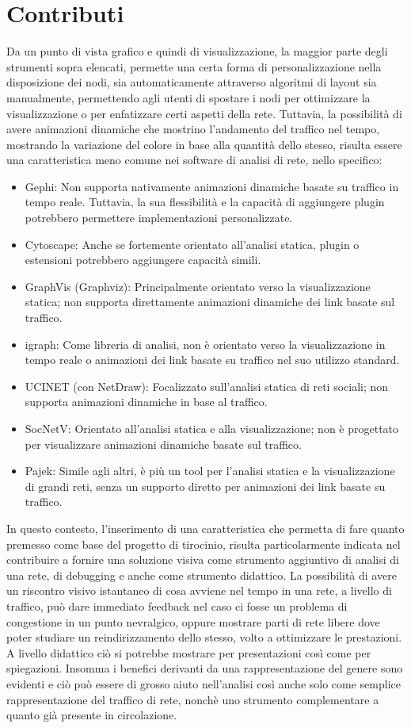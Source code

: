 \documentclass[binding=0.6cm]{sapthesis}
\begin{document}
\section{Contributi}
Da un punto di vista grafico e quindi di visualizzazione, la maggior parte degli strumenti sopra elencati, permette una certa forma di personalizzazione nella disposizione dei nodi, sia automaticamente attraverso algoritmi di layout sia manualmente, 
permettendo agli utenti di spostare i nodi per ottimizzare la visualizzazione o per enfatizzare certi aspetti della rete. Tuttavia, la possibilità di
avere animazioni dinamiche che mostrino l'andamento del traffico nel tempo, mostrando la variazione del colore in base alla quantità dello stesso, risulta
essere una caratteristica meno comune nei software di analisi di rete, nello specifico:
\begin{itemize}	
  \item Gephi: Non supporta nativamente animazioni dinamiche basate su traffico in tempo reale. Tuttavia, la sua flessibilità e la capacità di aggiungere plugin potrebbero permettere implementazioni personalizzate.
  \item Cytoscape: Anche se fortemente orientato all'analisi statica, plugin o estensioni potrebbero aggiungere capacità simili.
  \item GraphVis (Graphviz): Principalmente orientato verso la visualizzazione statica; non supporta direttamente animazioni dinamiche dei link basate sul traffico.
  \item igraph: Come libreria di analisi, non è orientato verso la visualizzazione in tempo reale o animazioni dei link basate su traffico nel suo utilizzo standard.
  \item UCINET (con NetDraw): Focalizzato sull'analisi statica di reti sociali; non supporta animazioni dinamiche in base al traffico.
  \item SocNetV: Orientato all'analisi statica e alla visualizzazione; non è progettato per visualizzare animazioni dinamiche basate sul traffico.
  \item Pajek: Simile agli altri, è più un tool per l'analisi statica e la visualizzazione di grandi reti, senza un supporto diretto per animazioni dei link basate su traffico.
\end{itemize}
In questo contesto, l'inserimento di una caratteristica che permetta di fare quanto premesso come base
del progetto di tirocinio, risulta particolarmente indicata nel contribuire a fornire una soluzione visiva come
strumento aggiuntivo di analisi di una rete, di debugging e anche come strumento didattico. La possibilità di
avere un riscontro visivo istantaneo di cosa avviene nel tempo in una rete, a livello di traffico, può dare immediato feedback nel
caso ci fosse un problema di congestione in un punto nevralgico, oppure mostrare parti di rete libere dove poter studiare un
reindirizzamento dello stesso, volto a ottimizzare le prestazioni. A livello didattico ciò si potrebbe mostrare per presentazioni così come per spiegazioni. 
Insomma i benefici derivanti da una rappresentazione del genere sono evidenti e ciò
può essere di grosso aiuto nell'analisi così anche solo come semplice rappresentazione del traffico di rete, nonchè uno strumento complementare a quanto già presente in circolazione.
\end{document}
